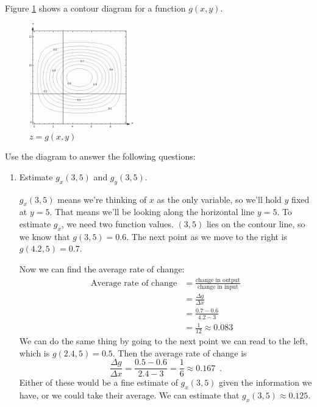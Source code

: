 \begin{example}
Figure \ref{fig:4-2-ex1} shows a contour diagram for a function $g(x,y)$.

\begin{figure}[!ht]
  \centering
    \includegraphics[width=0.4\textwidth]{img/chap4/image026.png}
    \caption{$z = g(x, y)$}
    \label{fig:4-2-ex1}
\end{figure}

Use the diagram to answer the following questions:
  \begin{enumerate}[label=(\alph*)]
    \item Estimate $g_x(3,5)$ and $g_y(3,5)$.

    \begin{solution} $g_x(3,5)$ means we're thinking of $x$ as the only variable, so we'll hold $y$ fixed at $y=5$. That means we’ll be looking along the horizontal line $y=5$. To estimate $g_x$, we need two function values. $(3, 5)$ lies on the contour line, so we know that $g(3,5)=0.6$. The next point as we move to the right is $g(4.2,5)=0.7$.

    Now we can find the average rate of change:
    \begin{align*}
    \mbox{Average rate of change} &= \frac{\mbox{change in output}}{\mbox{change in input}}\\
    &= \frac{\Delta g}{\Delta x}\\
    &= \frac{0.7-0.6}{4.2-3}\\
    &= \frac{1}{12}\approx   0.083
    \end{align*}
    We can do the same thing by going to the next point we can read to the left, which is $g(2.4,5)=0.5$. Then the average rate of change is
    $$ \frac{\Delta g}{\Delta x} = \frac{0.5-0.6}{2.4-3}=\frac{1}{6} \approx   0.167 \enspace .$$
    Either of these would be a fine estimate of $g_x(3,5)$ given the information we have, or we could take their average. We can estimate that $g_x(3,5)\approx   0.125$.


\end{solution}
\end{enumerate}
\end{example}
